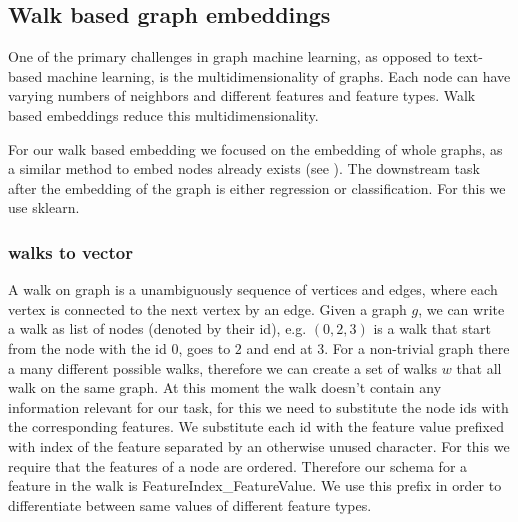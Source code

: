 \subsection{Walk based graph embeddings}

One of the primary challenges in graph machine learning, as opposed to text-based machine learning, is the multidimensionality of graphs. Each node can have varying numbers of neighbors and different features and feature types. Walk based embeddings reduce this multidimensionality.

For our walk based embedding we focused on the embedding of whole graphs, as a similar method to embed nodes already exists (see \cite{2016node2vec}). The downstream task after the embedding of the graph is either regression or classification. For this we use sklearn.

\subsubsection{walks to vector}
A walk on graph is a unambiguously sequence of vertices and edges, where each vertex is connected to the next vertex by an edge. Given a graph $g$, we can write a walk as list of nodes (denoted by their id), e.g. $(0, 2, 3)$ is a walk that start from the node with the id $0$, goes to $2$ and end at $3$. For a non-trivial graph there a many different possible walks, therefore we can create a set of walks $w$ that all walk on the same graph. At this moment the walk doesn't contain any information relevant for our task, for this we need to substitute the node ids with the corresponding features. We substitute each id with the feature value prefixed with index of the feature separated by an otherwise unused character. For this we require that the features of a node are ordered. Therefore our schema for a feature in the walk is FeatureIndex\_FeatureValue. We use this prefix in order to differentiate between same values of different feature types.


